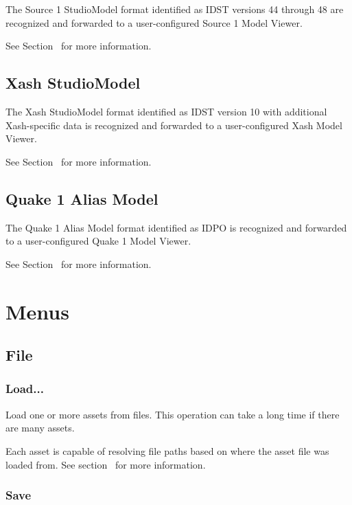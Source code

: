 \documentclass[10pt, a4paper, titlepage, oneside]{article}
\begin{document}
The Source 1 StudioModel format identified as IDST versions 44 through 48 are recognized and forwarded to a user-configured Source 1 Model Viewer.

See Section~ for more information.

\subsection{Xash StudioModel}

The Xash StudioModel format identified as IDST version 10 with additional Xash-specific data is recognized and forwarded to a user-configured Xash Model Viewer.

See Section~ for more information.

\subsection{Quake 1 Alias Model}

The Quake 1 Alias Model format identified as IDPO is recognized and forwarded to a user-configured Quake 1 Model Viewer.

See Section~ for more information.

\newpage

\section{Menus}

\subsection{File}

\subsubsection{Load...}

Load one or more assets from files. This operation can take a long time if there are many assets.

Each asset is capable of resolving file paths based on where the asset file was loaded from. See section~ for more information.

\subsubsection{Save}
\end{document}

